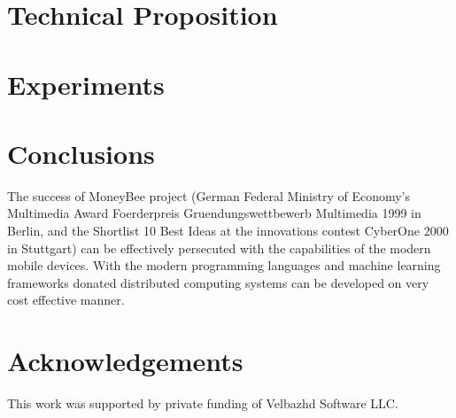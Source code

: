\documentclass{llncs}
\begin{document}
\section{Technical Proposition} \label{Technical Proposition}

\section{Experiments} \label{Experiments}

\section{Conclusions} \label{Conclusions}

The success of MoneyBee project (German Federal Ministry of Economy's Multimedia Award Foerderpreis Gruendungswettbewerb Multimedia 1999 in Berlin, and the Shortlist 10 Best Ideas at the innovations contest CyberOne 2000 in Stuttgart) can be effectively persecuted with the capabilities of the modern mobile devices. With the modern programming languages and machine learning frameworks donated distributed computing systems can be developed on very cost effective manner.


\section*{Acknowledgements}

This work was supported by private funding of Velbazhd Software LLC.

\end{document}
